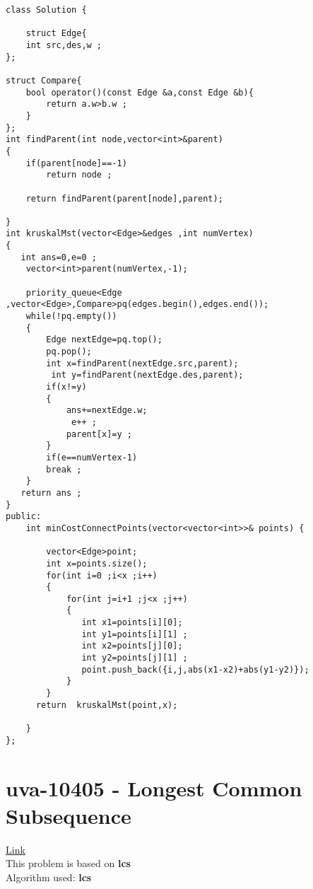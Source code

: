 \documentclass{article}
\begin{document}
\begin{lstlisting}[style=cppStyle]
class Solution {

    struct Edge{
    int src,des,w ;
};

struct Compare{
    bool operator()(const Edge &a,const Edge &b){
        return a.w>b.w ;
    }
};
int findParent(int node,vector<int>&parent)
{
    if(parent[node]==-1)
        return node ;

    return findParent(parent[node],parent);

}
int kruskalMst(vector<Edge>&edges ,int numVertex)
{
   int ans=0,e=0 ;
    vector<int>parent(numVertex,-1);

    priority_queue<Edge ,vector<Edge>,Compare>pq(edges.begin(),edges.end());
    while(!pq.empty())
    {
        Edge nextEdge=pq.top();
        pq.pop();
        int x=findParent(nextEdge.src,parent);
         int y=findParent(nextEdge.des,parent);
        if(x!=y)
        {
            ans+=nextEdge.w;
             e++ ;
            parent[x]=y ;
        }
        if(e==numVertex-1)
        break ;
    }
   return ans ;
}
public:
    int minCostConnectPoints(vector<vector<int>>& points) {

        vector<Edge>point;
        int x=points.size();
        for(int i=0 ;i<x ;i++)
        {
            for(int j=i+1 ;j<x ;j++)
            {
               int x1=points[i][0];
               int y1=points[i][1] ;
               int x2=points[j][0];
               int y2=points[j][1] ;
               point.push_back({i,j,abs(x1-x2)+abs(y1-y2)});
            }
        }
      return  kruskalMst(point,x);
        
    }
};
\end{lstlisting}

\section{uva-10405 - Longest Common Subsequence} \href{https://onlinejudge.org/index.php?option=com_onlinejudge&Itemid=8&page=show_problem&problem=1346}{Link} \\

This problem is based on  \textbf{ lcs  }\\
Algorithm used: \textbf{lcs}\\
\end{document}
